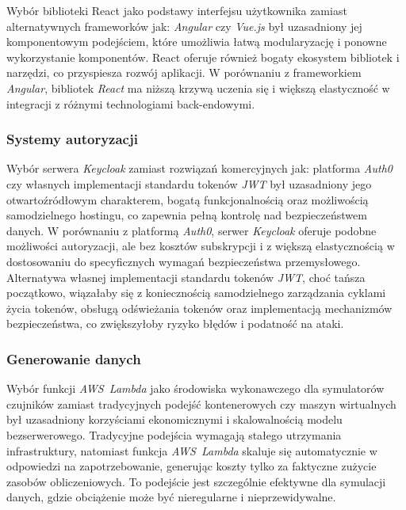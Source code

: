 {Wybór biblioteki React jako podstawy interfejsu użytkownika zamiast alternatywnych frameworków jak: \textit{\mbox{Angular}} czy \textit{\mbox{Vue.js}} był uzasadniony jej komponentowym podejściem, które umożliwia łatwą modularyzację i ponowne wykorzystanie komponentów. React oferuje również bogaty ekosystem bibliotek i narzędzi, co przyspiesza rozwój aplikacji. W porównaniu z frameworkiem \textit{\mbox{Angular}}, bibliotek \textit{\mbox{React}} ma niższą krzywą uczenia się i większą elastyczność w integracji z różnymi technologiami back-endowymi.

\subsubsection{Systemy autoryzacji}

Wybór serwera \textit{\mbox{Keycloak}} \cite{keycloak_docs} zamiast rozwiązań komercyjnych jak: platforma \textit{\mbox{Auth0}} czy własnych implementacji standardu tokenów \textit{\mbox{JWT}} \cite{jwt_rfc} był uzasadniony jego otwartoźródłowym charakterem, bogatą funkcjonalnością oraz możliwością samodzielnego hostingu, co zapewnia pełną kontrolę nad bezpieczeństwem danych. W porównaniu z platformą \textit{\mbox{Auth0}}, serwer \textit{\mbox{Keycloak}} oferuje podobne możliwości autoryzacji, ale bez kosztów subskrypcji i z większą elastycznością w dostosowaniu do specyficznych wymagań bezpieczeństwa przemysłowego. Alternatywa własnej implementacji standardu tokenów \textit{\mbox{JWT}}, choć tańsza początkowo, wiązałaby się z koniecznością samodzielnego zarządzania cyklami życia tokenów, obsługą odświeżania tokenów oraz implementacją mechanizmów bezpieczeństwa, co zwiększyłoby ryzyko błędów i podatność na ataki.

\subsubsection{Generowanie danych}

Wybór funkcji \textit{\mbox{AWS Lambda}} \cite{aws_lambda_docs} jako środowiska wykonawczego dla symulatorów czujników zamiast tradycyjnych podejść kontenerowych czy maszyn wirtualnych był uzasadniony korzyściami ekonomicznymi i skalowalnością modelu bezserwerowego. Tradycyjne podejścia wymagają stałego utrzymania infrastruktury, natomiast funkcja \textit{\mbox{AWS Lambda}} skaluje się automatycznie w odpowiedzi na zapotrzebowanie, generując koszty tylko za faktyczne zużycie zasobów obliczeniowych. To podejście jest szczególnie efektywne dla symulacji danych, gdzie obciążenie może być nieregularne i nieprzewidywalne.

}
